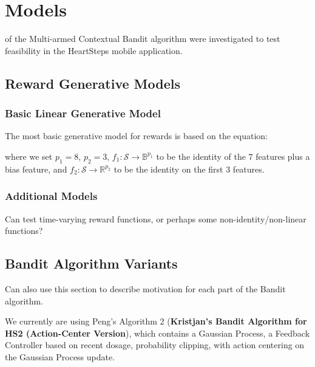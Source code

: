 
\chapter{Models}
\label{Models}

 of the Multi-armed Contextual Bandit algorithm were investigated to test feasibility in the HeartSteps mobile application.


\section{Reward Generative Models}
\label{Models/Reward Generative Models}


\subsection{Basic Linear Generative Model}
The most basic generative model for rewards is based on the equation:


where we set $p_1 = 8$, $p_2 = 3$, $f_1: \mathcal{S} \to \mathbb{B}^{p_1}$ to be the identity of the $7$ features plus a bias feature, and $f_2: \mathcal{S} \to \mathbb{R}^{p_2}$ to be the identity on the first $3$ features.

\subsection{Additional Models}

{\color{red} Can test time-varying reward functions, or perhaps some non-identity/non-linear functions?   }

\section{Bandit Algorithm Variants}
\label{Models/Bandit Algorithm Variants}

{\color{red} Can also use this section to describe motivation for each part of the Bandit algorithm.}


We currently are using Peng's Algorithm 2 ({\bf Kristjan's Bandit Algorithm for HS2 (Action-Center Version}), which contains a Gaussian Process, a Feedback Controller based on recent dosage, probability clipping, with action centering on the Gaussian Process update.

